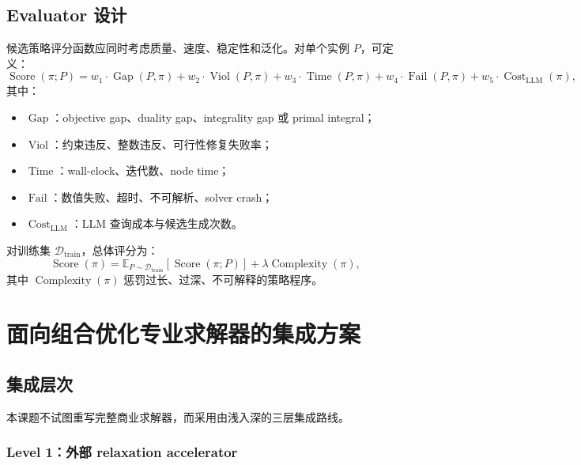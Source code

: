 \documentclass[UTF8,a4paper,12pt,fontset=fandol]{ctexart}
\begin{document}
\subsection{Evaluator 设计}

候选策略评分函数应同时考虑质量、速度、稳定性和泛化。对单个实例 $P$，可定义：
\begin{equation}
\operatorname{Score}(\pi;P)
=
w_1 \cdot \operatorname{Gap}(P,\pi)
+
w_2 \cdot \operatorname{Viol}(P,\pi)
+
w_3 \cdot \operatorname{Time}(P,\pi)
+
w_4 \cdot \operatorname{Fail}(P,\pi)
+
w_5 \cdot \operatorname{Cost}_{\text{LLM}}(\pi),
\end{equation}
其中：
\begin{itemize}[leftmargin=2em]
    \item $\operatorname{Gap}$：objective gap、duality gap、integrality gap 或 primal integral；
    \item $\operatorname{Viol}$：约束违反、整数违反、可行性修复失败率；
    \item $\operatorname{Time}$：wall-clock、迭代数、node time；
    \item $\operatorname{Fail}$：数值失败、超时、不可解析、solver crash；
    \item $\operatorname{Cost}_{\text{LLM}}$：LLM 查询成本与候选生成次数。
\end{itemize}

对训练集 $\mathcal{D}_{\text{train}}$，总体评分为：
\begin{equation}
\operatorname{Score}(\pi)
=
\mathbb{E}_{P\sim \mathcal{D}_{\text{train}}}
\left[\operatorname{Score}(\pi;P)\right]
+
\lambda \operatorname{Complexity}(\pi),
\end{equation}
其中 $\operatorname{Complexity}(\pi)$ 惩罚过长、过深、不可解释的策略程序。

\section{面向组合优化专业求解器的集成方案}

\subsection{集成层次}

本课题不试图重写完整商业求解器，而采用由浅入深的三层集成路线。

\subsubsection{Level 1：外部 relaxation accelerator}
\end{document}
